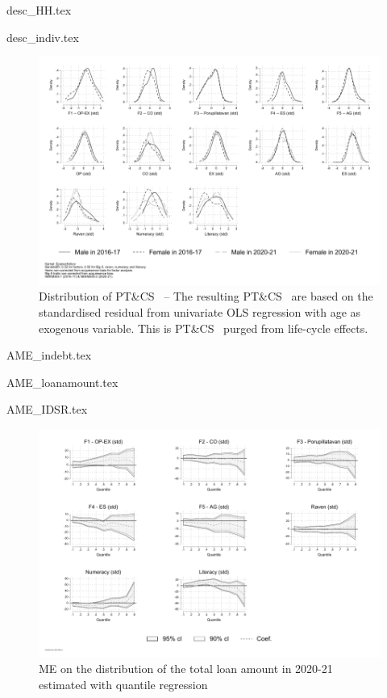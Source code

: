 \documentclass[a4paper, 11pt, onecolumn]{article}
\newcommand{\PTCS}{PT\&CS}
\begin{document}
{desc_HH.tex}

{desc_indiv.tex}

\begin{figure}[!h]
\raggedright
\includegraphics[width=\textwidth]{INPUT/Kernel_PTCS_raw_new}
\caption{Distribution of \PTCS~ -- The resulting \PTCS~ are based on the standardised residual from univariate OLS regression with age as exogenous variable. This is \PTCS~ purged from life-cycle effects.}
\label{fig:PTCS}
\end{figure}

{AME_indebt.tex}

{AME_loanamount.tex}

{AME_IDSR.tex}

\begin{figure}[!h]
\raggedright
\includegraphics[width=\textwidth]{INPUT/qreg_loanamount_indiv1000_2}
\caption{ME on the distribution of the total loan amount in 2020-21 estimated with quantile regression}
\label{fig:qreg_loanamount}
\end{figure}
\end{document}
